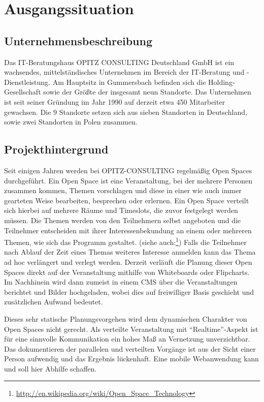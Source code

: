 \section{Ausgangssituation}
\subsection{Unternehmensbeschreibung}
Das IT-Beratungshaus OPITZ CONSULTING Deutschland GmbH ist ein
wachsendes, mittelständisches Unternehmen im Bereich der IT-Beratung
und -Dienstleistung. Am Hauptsitz in Gummersbach befinden sich die
Holding-Gesellschaft sowie der Größte der insgesamt neun Standorte.
Das Unternehmen ist seit seiner Gründung im Jahr 1990 auf derzeit etwa
450 Mitarbeiter gewachsen. Die 9 Standorte setzen sich aus sieben
Standorten in Deutschland, sowie zwei Standorten in Polen zusammen.
\subsection{Projekthintergrund}
Seit einigen Jahren werden bei OPITZ-CONSULTING regelmäßig Open Spaces
durchgeführt. Ein Open Space ist eine Veranstaltung, bei der mehrere
Personen zusammen kommen, Themen vorschlagen und diese in einer wie
auch immer gearteten Weise bearbeiten, besprechen oder erlernen. Ein
Open Space verteilt sich hierbei auf mehrere Räume und Timeslots, die
zuvor festgelegt werden müssen. Die Themen werden von den Teilnehmern
selbst angeboten und die Teilnehmer entscheiden mit ihrer
Interessenbekundung an einem oder mehreren Themen, wie sich das
Programm gestaltet. (siehe auch:\footnote{\url{http://en.wikipedia.org/wiki/Open_Space_Technology}})
Falls die Teilnehmer nach Ablauf der Zeit eines Themas weiteres
Interesse anmelden kann das Thema ad hoc verlängert und verlegt
werden.
\noindent Derzeit verläuft die Planung dieser Open Spaces direkt auf
der Veranstaltung mithilfe von Whiteboards oder Flipcharts. Im
Nachhinein wird dann zumeist in einem \gls{CMS} über die Veranstaltungen
berichtet und Bilder hochgeladen, wobei dies auf freiwilliger Basis
geschieht und zusätzlichen Aufwand bedeutet.

\noindent Dieses sehr statische Planungsvorgehen wird dem dynamischen
Charakter von Open Spaces nicht gerecht. Als verteilte Veranstaltung
mit ``Realtime''-Aspekt ist für eine sinnvolle Kommunikation ein hohes
Maß an Vernetzung unverzichtbar. Das dokumentieren der parallelen und
verteilten Vorgänge ist aus der Sicht einer Person aufwendig und das
Ergebnis lückenhaft. Eine mobile Webanwendung kann und soll hier
Abhilfe schaffen.

